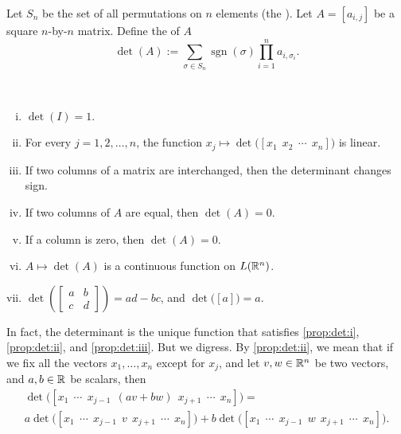 Let $S_n$  be the set of all permutations on $n$ elements (the
\emph{}).
Let $A= [a_{i,j}]$ be a square $n$-by-$n$ matrix.  Define the \emph{} of $A$
\begin{equation*}
\det(A) := 
\sum_{\sigma \in S_n}
\operatorname{sgn} (\sigma) \prod_{i=1}^n a_{i,\sigma_i} .
\end{equation*}

\pagebreak[0]
\begin{prop}
{\ }
\begin{enumerate}[(i)]
\item \label{prop:det:i} $\det(I) = 1$.
\item \label{prop:det:ii} For every $j=1,2,\ldots,n$, the function $x_j
\mapsto \det\bigl([x_1 ~~ x_2 ~~ \cdots ~~ x_n ]\bigr)$
is linear.
\item \label{prop:det:iii} If two columns of a matrix are interchanged, then the determinant changes
sign.
\item \label{prop:det:iv} If two columns of $A$ are equal, then $\det(A) = 0$.
\item \label{prop:det:v} If a column is zero, then $\det(A) = 0$.
\item \label{prop:det:vi} $A \mapsto \det(A)$ is a continuous function on
$L({\mathbb{R}}^n)$.
\item \label{prop:det:vii} $\det\left( \left[\begin{smallmatrix} a & b \\ c
&d \end{smallmatrix}\right] \right)
= ad-bc$, and $\det \bigl( [a] \bigr) = a$.
\end{enumerate}
\end{prop}

In fact, the determinant is the unique function that satisfies
\ref{prop:det:i},
\ref{prop:det:ii}, and
\ref{prop:det:iii}.
But we digress.  By \ref{prop:det:ii}, we mean that if we fix all the vectors
$x_1,\ldots,x_n$ except for $x_j$, and let
$v,w \in {\mathbb{R}}^n$ be two vectors,
and $a,b \in {\mathbb{R}}$ be scalars, then
\begin{multline*}
\det\bigl([x_1 ~~ \cdots ~~ x_{j-1} ~~ (av+bw) ~~ x_{j+1} ~~ \cdots ~~
x_n]\bigr) =
\\
a \det\bigl([x_1 ~~ \cdots ~~ x_{j-1} ~~ v ~~ x_{j+1} ~~ \cdots ~~ x_n]\bigr)
+
b
\det\bigl([x_1 ~~ \cdots ~~ x_{j-1} ~~ w ~~ x_{j+1} ~~ \cdots ~~ x_n]\bigr) .
\end{multline*}

